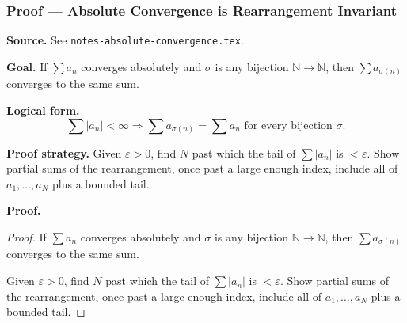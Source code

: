 

\clearpage
{}
\hypertarget{proof-RA-ABB-T-abs-conv-rearrangement-inv}{}

\subsubsection[Absolute Convergence is Rearrangement Invariant]{Proof --- Absolute Convergence is Rearrangement Invariant}

\bigskip

\noindent
\textbf{Source.} See \texttt{notes-absolute-convergence.tex}.

\vspace{0.75em}

\noindent
\textbf{Goal.} If $\sum a_n$ converges absolutely and $\sigma$ is any bijection $\mathbb{N} \to \mathbb{N}$, then $\sum a_{\sigma(n)}$ converges to the same sum.

\vspace{0.75em}

\noindent
\textbf{Logical form.}
\[
  \sum |a_n| < \infty \Rightarrow \sum a_{\sigma(n)} = \sum a_n \text{ for every bijection } \sigma.
\]

\vspace{0.75em}

\noindent
\textbf{Proof strategy.} Given $\varepsilon > 0$, find $N$ past which the tail of $\sum |a_n|$ is $< \varepsilon$. Show partial sums of the rearrangement, once past a large enough index, include all of $a_1, \ldots, a_N$ plus a bounded tail.

\vspace{0.75em}

\noindent
\textbf{Proof.}
\begin{proof}
\Claim If $\sum a_n$ converges absolutely and $\sigma$ is any bijection $\mathbb{N} \to \mathbb{N}$, then $\sum a_{\sigma(n)}$ converges to the same sum.

\Given 

\Goal 

\Strategy Given $\varepsilon > 0$, find $N$ past which the tail of $\sum |a_n|$ is $< \varepsilon$. Show partial sums of the rearrangement, once past a large enough index, include all of $a_1, \ldots, a_N$ plus a bounded tail.

\medskip


\end{proof}

